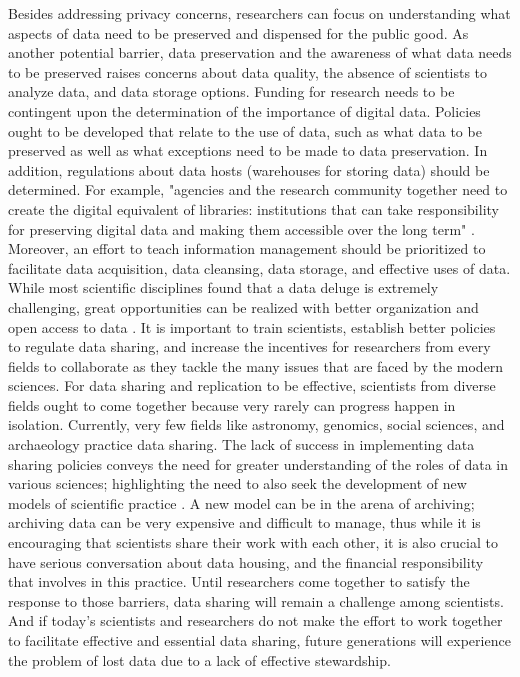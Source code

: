 \documentclass[sigconf]{acmart}
\begin{document}
Besides addressing privacy concerns, researchers can focus on understanding what aspects of data need to be preserved and dispensed for the public good. As another potential barrier, data preservation and the awareness of what data needs to be preserved raises concerns about data quality, the absence of scientists to analyze data, and data storage options. Funding for research needs to be contingent upon the determination of the importance of digital data. Policies ought to be developed that relate to the use of data, such as what data to be preserved as well as what exceptions need to be made to data preservation. In addition, regulations about data hosts (warehouses for storing data) should be determined. For example, "agencies and the research community together need to create the digital equivalent of libraries: institutions that can take responsibility for preserving digital data and making them accessible over the long term" \cite{pryor2009skilling}.  Moreover, an effort to teach information management should be prioritized to facilitate data acquisition, data cleansing, data storage, and effective uses of data. While most scientific disciplines found that a data deluge is extremely challenging, great opportunities can be realized with better organization and open access to data \cite{economic22challenges}. It is important to train scientists, establish better policies to regulate data sharing, and increase the incentives for researchers from every fields to collaborate as they tackle the many issues that are faced by the modern sciences.
For data sharing and replication to be effective, scientists from diverse fields ought to come together because very rarely can progress happen in isolation. Currently, very few fields like astronomy, genomics, social sciences, and archaeology practice data sharing. The lack of success in implementing data sharing policies conveys the need for greater understanding of the roles of data in various sciences; highlighting the need to also seek the development of new models of scientific practice \cite{borgman2015if}. A new model can be in the arena of archiving; archiving data can be very expensive and difficult to manage, thus while it is encouraging that scientists share their work with each other, it is also crucial to have serious conversation about data housing, and the financial responsibility that involves in this practice. Until researchers come together to satisfy the response to those barriers, data sharing will remain a challenge among scientists. And if today's scientists and researchers do not make the effort to work together to facilitate effective and essential data sharing, future generations will experience the problem of lost data due to a lack of effective stewardship. 
\end{document}
